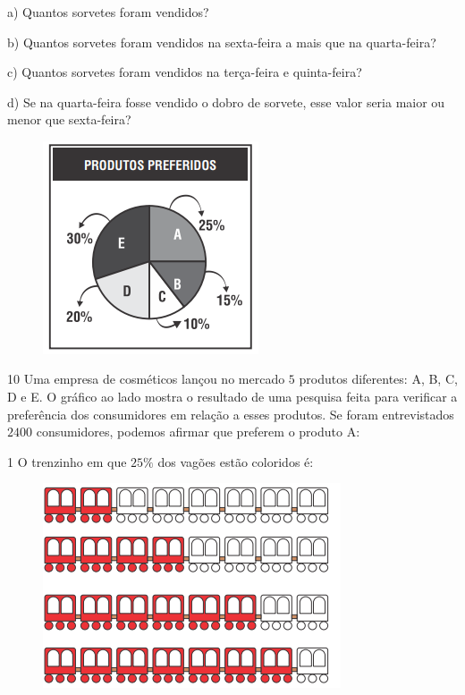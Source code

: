 a) Quantos sorvetes foram vendidos? 

b) Quantos sorvetes foram vendidos na sexta-feira a mais que na
quarta-feira? 

c) Quantos sorvetes foram vendidos na terça-feira e quinta-feira? 

d) Se na quarta-feira fosse vendido o dobro de sorvete, esse valor seria
maior ou menor que sexta-feira? 

\begin{figure}
\includegraphics[width=2.51181in,height=2.47708in]{./imgSAEB_6_MAT/media/image88.png}
\end{figure}

\num{10} Uma empresa de cosméticos lançou no mercado $5$ produtos diferentes:
A, B, C, D e E. O gráfico ao lado mostra o resultado de uma pesquisa feita para
verificar a preferência dos consumidores em relação a esses produtos. Se foram entrevistados $2400$ consumidores, podemos afirmar que preferem o
produto A:



\num{1}  O trenzinho em que $25\%$ dos vagões estão coloridos é:

\begin{figure}
\includegraphics[width=3.46528in,height=2.38403in]{./imgSAEB_6_MAT/media/image89.png}
\end{figure}

